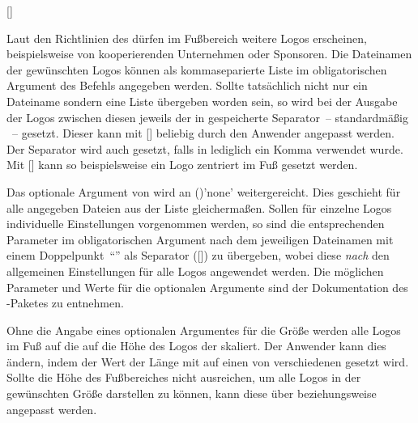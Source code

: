 \begin{Declaration*}{}
\begin{Declaration*}{}
\begin{Declaration*}{}
\begin{Declaration}[v2.03]{%
  [\LParameter{}]%
}
\begin{Declaration}[v2.03]{}
\begin{Declaration}[v2.03]{}
Laut den Richtlinien des \CDs dürfen im Fußbereich weitere Logos erscheinen, 
beispielsweise von kooperierenden Unternehmen oder Sponsoren. Die Dateinamen 
der gewünschten Logos können als kommaseparierte Liste im obligatorischen 
Argument des Befehls  angegeben werden. Sollte tatsächlich 
nicht nur ein Dateiname sondern eine Liste übergeben worden sein, so wird bei 
der Ausgabe der Logos zwischen diesen jeweils der in  
gespeicherte Separator~-- standardmäßig ~-- gesetzt. Dieser kann 
mit [\PParameter{\dots}] beliebig 
durch den Anwender angepasst werden. Der Separator wird auch gesetzt, falls in 
 lediglich ein Komma verwendet wurde. Mit 
[] kann so beispielsweise ein 
Logo zentriert im Fuß gesetzt werden.

Das optionale Argument von  wird an 
()'none' weitergereicht. Dies 
geschieht für alle angegeben Dateien aus der Liste gleichermaßen. Sollen für 
einzelne Logos individuelle Einstellungen vorgenommen werden, so sind die 
entsprechenden Parameter im obligatorischen Argument nach dem jeweiligen 
Dateinamen mit einem Doppelpunkt~\enquote{\PValue{:}} als Separator 
([]) zu 
übergeben, wobei diese \emph{nach} den allgemeinen Einstellungen für alle Logos 
angewendet werden. Die möglichen Parameter und Werte für die optionalen 
Argumente sind der Dokumentation des -Paketes zu entnehmen.

Ohne die Angabe eines optionalen Argumentes für die Größe werden alle Logos im 
Fuß auf die auf die Höhe des Logos der \TnUD skaliert. Der Anwender kann dies 
ändern, indem der Wert der Länge  mit  
auf einen von \PValue{0pt} verschiedenen gesetzt wird. Sollte die Höhe des 
Fußbereiches nicht ausreichen, um alle Logos in der gewünschten Größe 
darstellen zu können, kann diese über  
beziehungsweise  angepasst werden.
\end{Declaration}
\end{Declaration}
\end{Declaration}


\end{Declaration*}
\end{Declaration*}
\end{Declaration*}
